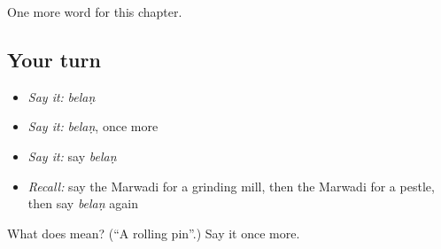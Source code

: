 \begin{grammarlens}[title={What you've built}]
One more word for this chapter.
\end{grammarlens}

\subsection*{Your turn}
\begin{itemize}
\raggedright
  \item \emph{Say it:} \emph{belaṇ}
  \item \emph{Say it:} \emph{belaṇ}, once more
  \item \emph{Say it:} say \emph{belaṇ}
  \item \emph{Recall:} say the Marwadi for a grinding mill, then the Marwadi for a pestle, then say \emph{belaṇ} again
\end{itemize}

\begin{tcolorbox}[breakable,colback=teal!4,colframe=teal!35!black,title={Before you move on}]
What does  mean? (\textquotedblleft{}A rolling pin\textquotedblright{}.) Say it once more.
\end{tcolorbox}
